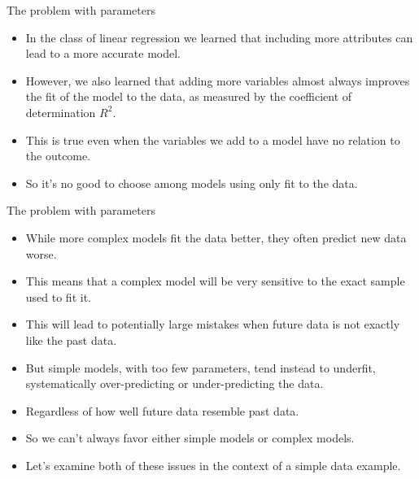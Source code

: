 \documentclass[handout]{beamer}
\begin{document}
\begin{frame}{The problem with parameters}
\scriptsize{

\begin{itemize}
\item In the class of linear regression we learned that including more attributes can lead to a more accurate model.

\item However, we also learned that adding more variables almost always improves the fit of the model to the data, as measured by the coefficient of determination $R^2$. 
\item This is true even when the variables we  add to a model have no relation to the outcome. 

\item So it's no good to choose among models using only fit to the data.






\end{itemize}


} 
\end{frame}

\begin{frame}{The problem with parameters}
\scriptsize{

\begin{itemize}

\item While more complex models fit the data better, they often predict new data worse.

\item This means that a complex model will be very sensitive to the exact sample used to fit it.

\item This will lead to potentially large mistakes when future data is not exactly like the past data.

\item But simple models, with too few parameters, tend instead to underfit, systematically over-predicting or under-predicting the data.

\item Regardless of how well future data resemble past data. 
\item So we can't always favor either simple models or complex models.

\item Let’s examine both of these issues in the context of a simple data example.

\end{itemize}


} 
\end{frame}
\end{document}
